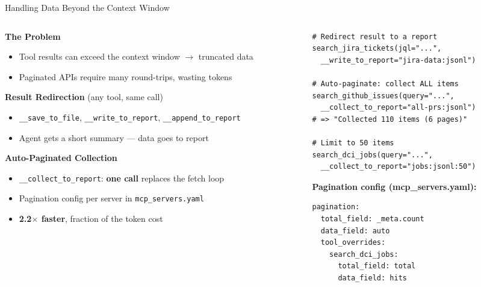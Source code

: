 \documentclass[aspectratio=169,10pt]{beamer}
\begin{document}
\begin{frame}[fragile]{Handling Data Beyond the Context Window}
\begin{columns}[T]
\begin{column}{0.45\textwidth}
\textbf{The Problem}
\begin{itemize}\scriptsize
  \item Tool results can exceed the context window $\rightarrow$ \alert{truncated data}
  \item Paginated APIs require many round-trips, wasting tokens
\end{itemize}

\smallskip
\textbf{Result Redirection} (any tool, same call)
\begin{itemize}\scriptsize
  \item \texttt{\_\_save\_to\_file}, \texttt{\_\_write\_to\_report}, \texttt{\_\_append\_to\_report}
  \item Agent gets a short summary --- data goes to report
\end{itemize}

\smallskip
\textbf{Auto-Paginated Collection}
\begin{itemize}\scriptsize
  \item \texttt{\_\_collect\_to\_report}: \textbf{one call} replaces the fetch loop
  \item Pagination config per server in \texttt{mcp\_servers.yaml}
  \item \textbf{2.2$\times$ faster}, fraction of the token cost
\end{itemize}
\end{column}
\begin{column}{0.50\textwidth}
\begin{lstlisting}[style=code,basicstyle=\ttfamily\tiny]
# Redirect result to a report
search_jira_tickets(jql="...",
  __write_to_report="jira-data:jsonl")

# Auto-paginate: collect ALL items
search_github_issues(query="...",
  __collect_to_report="all-prs:jsonl")
# => "Collected 110 items (6 pages)"

# Limit to 50 items
search_dci_jobs(query="...",
  __collect_to_report="jobs:jsonl:50")
\end{lstlisting}

\smallskip
\textbf{\scriptsize Pagination config (mcp\_servers.yaml):}
\begin{lstlisting}[style=yaml,basicstyle=\ttfamily\tiny]
pagination:
  total_field: _meta.count
  data_field: auto
  tool_overrides:
    search_dci_jobs:
      total_field: total
      data_field: hits
\end{lstlisting}
\end{column}
\end{columns}
\end{frame}
\end{document}
